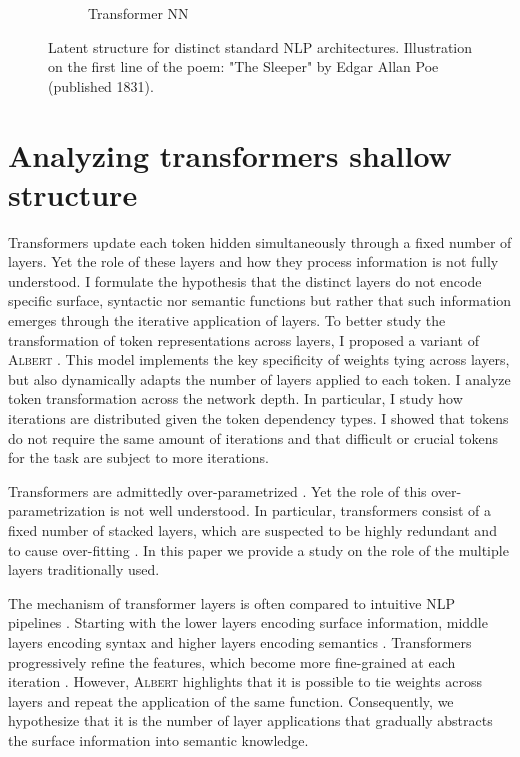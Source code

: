 \begin{figure}[htb!]
\begin{subfigure}[b]{0.475\textwidth}
        \caption{Transformer NN}
        \label{subfig:structure-6}
    \end{subfigure}
    \caption{Latent structure for distinct standard NLP architectures. Illustration on the first line of the poem: "The Sleeper" by Edgar Allan Poe (published 1831).} 
    \label{fig:structure}
\end{figure}

\section{Analyzing transformers shallow structure}

Transformers update each token hidden simultaneously through a fixed number of layers. Yet the role of these layers and how they process information is not fully understood. I formulate the hypothesis that the distinct layers do not encode specific surface, syntactic nor semantic functions but rather that such information emerges through the iterative application of layers. To better study the transformation of token representations across layers, I proposed a variant of \textsc{Albert} \parencite{simoulin_2021b}. This model implements the key specificity of weights tying across layers, but also dynamically adapts the number of layers applied to each token. I analyze token transformation across the network depth. In particular, I study how iterations are distributed given the token dependency types. I showed that tokens do not require the same amount of iterations and that difficult or crucial tokens for the task are subject to more iterations.

Transformers are admittedly over-parametrized \parencite{chen_20, hou_20, voita_19}. Yet the role of this over-parametrization is not well understood. In particular, transformers consist of a fixed number of stacked layers, which are suspected to be highly redundant \parencite{liu_20} and to cause over-fitting \parencite{fan_20, zhou_20b}. In this paper we provide a study on the role of the multiple layers traditionally used. 

The mechanism of transformer layers is often compared to intuitive NLP pipelines \parencite{tenney_19}. Starting with the lower layers encoding surface information, middle layers encoding syntax and higher layers encoding semantics \parencite{jawahar_19, peters_18}. Transformers progressively refine the features, which become more fine-grained at each iteration \parencite{xin_20}.  However, \textsc{Albert}  \parencite{lan_20} highlights that it is possible to tie weights across layers and repeat the application of the same function. Consequently, we hypothesize that it is the number of layer applications that gradually abstracts the surface information into semantic knowledge.

